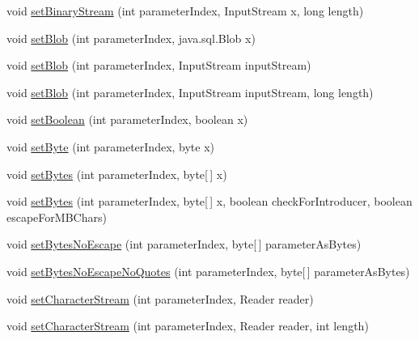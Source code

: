 \begin{DoxyCompactItemize}
\item 
void \mbox{\hyperlink{interfacecom_1_1mysql_1_1cj_1_1_query_bindings_a65ca2a3794efcd8c908d80afb950f495}{set\+Binary\+Stream}} (int parameter\+Index, Input\+Stream x, long length)
\item 
void \mbox{\hyperlink{interfacecom_1_1mysql_1_1cj_1_1_query_bindings_a55c147c4cd989f7533f34e82889f6f07}{set\+Blob}} (int parameter\+Index, java.\+sql.\+Blob x)
\item 
void \mbox{\hyperlink{interfacecom_1_1mysql_1_1cj_1_1_query_bindings_a612b7175f9fd75d62624a40f3f626b19}{set\+Blob}} (int parameter\+Index, Input\+Stream input\+Stream)
\item 
void \mbox{\hyperlink{interfacecom_1_1mysql_1_1cj_1_1_query_bindings_adfb912cfb12379cfdf4eea6833fb7e7d}{set\+Blob}} (int parameter\+Index, Input\+Stream input\+Stream, long length)
\item 
void \mbox{\hyperlink{interfacecom_1_1mysql_1_1cj_1_1_query_bindings_a0aba845fabc0265eda0a056bd87e21d8}{set\+Boolean}} (int parameter\+Index, boolean x)
\item 
void \mbox{\hyperlink{interfacecom_1_1mysql_1_1cj_1_1_query_bindings_a16cd7806599dbe59b5cb7730d1b94a92}{set\+Byte}} (int parameter\+Index, byte x)
\item 
void \mbox{\hyperlink{interfacecom_1_1mysql_1_1cj_1_1_query_bindings_afe53c908490903fa6c9b340b7b435a3d}{set\+Bytes}} (int parameter\+Index, byte\mbox{[}$\,$\mbox{]} x)
\item 
void \mbox{\hyperlink{interfacecom_1_1mysql_1_1cj_1_1_query_bindings_a43eed8e96b28e5ff529eb6eb25e01bc7}{set\+Bytes}} (int parameter\+Index, byte\mbox{[}$\,$\mbox{]} x, boolean check\+For\+Introducer, boolean escape\+For\+M\+B\+Chars)
\item 
void \mbox{\hyperlink{interfacecom_1_1mysql_1_1cj_1_1_query_bindings_aa92daa6a1d23b167bc0400bfa3a82012}{set\+Bytes\+No\+Escape}} (int parameter\+Index, byte\mbox{[}$\,$\mbox{]} parameter\+As\+Bytes)
\item 
void \mbox{\hyperlink{interfacecom_1_1mysql_1_1cj_1_1_query_bindings_aa6db593647f534f2788e3b8da618b9c2}{set\+Bytes\+No\+Escape\+No\+Quotes}} (int parameter\+Index, byte\mbox{[}$\,$\mbox{]} parameter\+As\+Bytes)
\item 
void \mbox{\hyperlink{interfacecom_1_1mysql_1_1cj_1_1_query_bindings_a9a8a5478dc70771dc426208803ca9b91}{set\+Character\+Stream}} (int parameter\+Index, Reader reader)
\item 
void \mbox{\hyperlink{interfacecom_1_1mysql_1_1cj_1_1_query_bindings_a0f1c2e28ff5e3e383b224d033019957b}{set\+Character\+Stream}} (int parameter\+Index, Reader reader, int length)

\end{DoxyCompactItemize}
